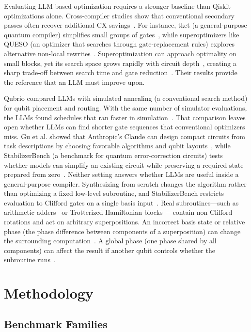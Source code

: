 \documentclass[12pt]{article}
\begin{document}
Evaluating LLM-based optimization requires a stronger baseline than Qiskit optimizations alone. Cross-compiler studies show that conventional secondary passes often recover additional CX savings~\cite{quspect}. For instance, tket (a general-purpose quantum compiler)
simplifies small groups of gates~\cite{tket}, while superoptimizers like QUESO (an optimizer that searches through gate-replacement
rules) explores alternative non-local rewrites~\cite{queso}. Superoptimization can approach optimality on small blocks, yet its search space grows rapidly with circuit depth~\cite{amy-mitm}, creating a sharp trade-off between search time and gate reduction~\cite{quspect}. Their results provide the reference that an
LLM must improve upon.

\newpage
Qubrio compared LLMs with simulated annealing (a conventional search method) for qubit placement and routing. With the same number of simulator evaluations, the LLMs found schedules that ran faster in simulation~\cite{qubrio}. That comparison leaves open whether LLMs can find shorter gate sequences that conventional optimizers miss. Gu et al. showed that Anthropic's Claude can design compact circuits from task descriptions by choosing favorable algorithms and qubit layouts~\cite{gu}, while StabilizerBench (a benchmark for quantum error-correction circuits) tests
whether models can simplify an existing circuit while preserving a required state prepared from
zero~\cite{stabilizerbench}. Neither setting answers whether LLMs are useful inside a general-purpose compiler. Synthesizing from scratch changes the algorithm rather than optimizing a fixed low-level subroutine, and StabilizerBench restricts evaluation to Clifford gates on a single basis input~\cite{stabilizerbench}. Real subroutines—such as arithmetic adders~\cite{draper} or Trotterized Hamiltonian blocks~\cite{childs-trotter}—contain non-Clifford rotations and act on arbitrary superpositions. An incorrect basis state or relative phase (the phase difference between components of a superposition) can change the surrounding computation~\cite{burgholzer-wille}. A global phase (one phase shared by all components) can affect the result if another qubit controls whether the subroutine runs~\cite{araujo}.

\section{Methodology}

\subsection{Benchmark Families}
\end{document}

